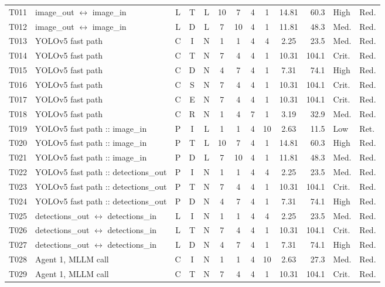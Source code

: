 \documentclass[9pt]{extarticle}
\begin{document}
\begin{longtable}{l>{\raggedright\arraybackslash}p{6.3cm}ccccccccrll}
T011 & image\_out $\leftrightarrow$ image\_in & L & T & L & 10 & 7 & 4 & 1 & 14.81 & 60.3 & High & Red. \\
T012 & image\_out $\leftrightarrow$ image\_in & L & D & L & 7 & 10 & 4 & 1 & 11.81 & 48.3 & Med. & Red. \\
T013 & YOLOv5 fast path & C & I & N & 1 & 1 & 4 & 4 & 2.25 & 23.5 & Med. & Red. \\
T014 & YOLOv5 fast path & C & T & N & 7 & 4 & 4 & 1 & 10.31 & 104.1 & Crit. & Red. \\
T015 & YOLOv5 fast path & C & D & N & 4 & 7 & 4 & 1 & 7.31 & 74.1 & High & Red. \\
T016 & YOLOv5 fast path & C & S & N & 7 & 4 & 4 & 1 & 10.31 & 104.1 & Crit. & Red. \\
T017 & YOLOv5 fast path & C & E & N & 7 & 4 & 4 & 1 & 10.31 & 104.1 & Crit. & Red. \\
T018 & YOLOv5 fast path & C & R & N & 1 & 4 & 7 & 1 & 3.19 & 32.9 & Med. & Red. \\
T019 & YOLOv5 fast path :: image\_in & P & I & L & 1 & 1 & 4 & 10 & 2.63 & 11.5 & Low & Ret. \\
T020 & YOLOv5 fast path :: image\_in & P & T & L & 10 & 7 & 4 & 1 & 14.81 & 60.3 & High & Red. \\
T021 & YOLOv5 fast path :: image\_in & P & D & L & 7 & 10 & 4 & 1 & 11.81 & 48.3 & Med. & Red. \\
T022 & YOLOv5 fast path :: detections\_out & P & I & N & 1 & 1 & 4 & 4 & 2.25 & 23.5 & Med. & Red. \\
T023 & YOLOv5 fast path :: detections\_out & P & T & N & 7 & 4 & 4 & 1 & 10.31 & 104.1 & Crit. & Red. \\
T024 & YOLOv5 fast path :: detections\_out & P & D & N & 4 & 7 & 4 & 1 & 7.31 & 74.1 & High & Red. \\
T025 & detections\_out $\leftrightarrow$ detections\_in & L & I & N & 1 & 1 & 4 & 4 & 2.25 & 23.5 & Med. & Red. \\
T026 & detections\_out $\leftrightarrow$ detections\_in & L & T & N & 7 & 4 & 4 & 1 & 10.31 & 104.1 & Crit. & Red. \\
T027 & detections\_out $\leftrightarrow$ detections\_in & L & D & N & 4 & 7 & 4 & 1 & 7.31 & 74.1 & High & Red. \\
T028 & Agent 1, MLLM call & C & I & N & 1 & 1 & 4 & 10 & 2.63 & 27.3 & Med. & Red. \\
T029 & Agent 1, MLLM call & C & T & N & 7 & 4 & 4 & 1 & 10.31 & 104.1 & Crit. & Red. \\

\end{longtable}
\end{document}
